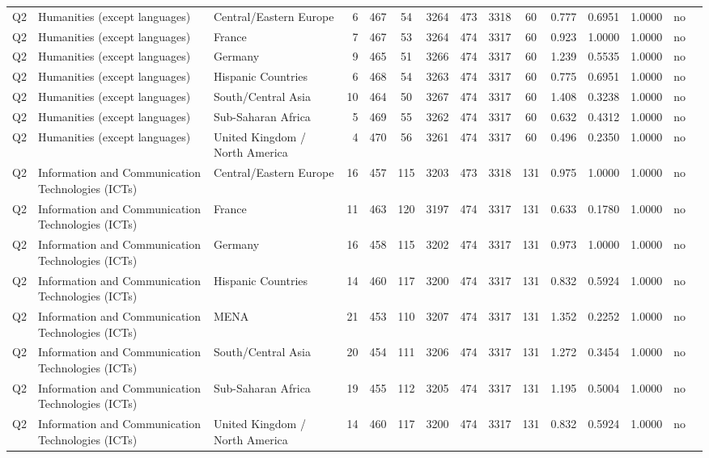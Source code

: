 \begin{longtable}{lllrcccccccccll}
Q2 & Humanities (except languages) & Central/Eastern Europe & 6 & 467 & 54 & 3264 & 473 & 3318 & 60 & 0.777 & 0.6951 & 1.0000 & no \\
Q2 & Humanities (except languages) & France & 7 & 467 & 53 & 3264 & 474 & 3317 & 60 & 0.923 & 1.0000 & 1.0000 & no \\
Q2 & Humanities (except languages) & Germany & 9 & 465 & 51 & 3266 & 474 & 3317 & 60 & 1.239 & 0.5535 & 1.0000 & no \\
Q2 & Humanities (except languages) & Hispanic Countries & 6 & 468 & 54 & 3263 & 474 & 3317 & 60 & 0.775 & 0.6951 & 1.0000 & no \\
Q2 & Humanities (except languages) & South/Central Asia & 10 & 464 & 50 & 3267 & 474 & 3317 & 60 & 1.408 & 0.3238 & 1.0000 & no \\
Q2 & Humanities (except languages) & Sub-Saharan Africa & 5 & 469 & 55 & 3262 & 474 & 3317 & 60 & 0.632 & 0.4312 & 1.0000 & no \\
Q2 & Humanities (except languages) & United Kingdom / North America & 4 & 470 & 56 & 3261 & 474 & 3317 & 60 & 0.496 & 0.2350 & 1.0000 & no \\
Q2 & Information and Communication Technologies (ICTs) & Central/Eastern Europe & 16 & 457 & 115 & 3203 & 473 & 3318 & 131 & 0.975 & 1.0000 & 1.0000 & no \\
Q2 & Information and Communication Technologies (ICTs) & France & 11 & 463 & 120 & 3197 & 474 & 3317 & 131 & 0.633 & 0.1780 & 1.0000 & no \\
Q2 & Information and Communication Technologies (ICTs) & Germany & 16 & 458 & 115 & 3202 & 474 & 3317 & 131 & 0.973 & 1.0000 & 1.0000 & no \\
Q2 & Information and Communication Technologies (ICTs) & Hispanic Countries & 14 & 460 & 117 & 3200 & 474 & 3317 & 131 & 0.832 & 0.5924 & 1.0000 & no \\
Q2 & Information and Communication Technologies (ICTs) & MENA & 21 & 453 & 110 & 3207 & 474 & 3317 & 131 & 1.352 & 0.2252 & 1.0000 & no \\
Q2 & Information and Communication Technologies (ICTs) & South/Central Asia & 20 & 454 & 111 & 3206 & 474 & 3317 & 131 & 1.272 & 0.3454 & 1.0000 & no \\
Q2 & Information and Communication Technologies (ICTs) & Sub-Saharan Africa & 19 & 455 & 112 & 3205 & 474 & 3317 & 131 & 1.195 & 0.5004 & 1.0000 & no \\
Q2 & Information and Communication Technologies (ICTs) & United Kingdom / North America & 14 & 460 & 117 & 3200 & 474 & 3317 & 131 & 0.832 & 0.5924 & 1.0000 & no \\

\end{longtable}
